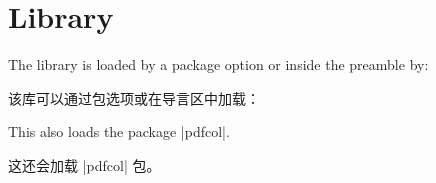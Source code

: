 \setcounter{section}{18}
\section{Library }\label{sec:breakable}%
%
The library is loaded by a package option or inside the preamble by:

该库可以通过包选项或在导言区中加载：
\begin{dispListing}
\end{dispListing}
This also loads the package |pdfcol|.

这还会加载 |pdfcol| 包。

% 




